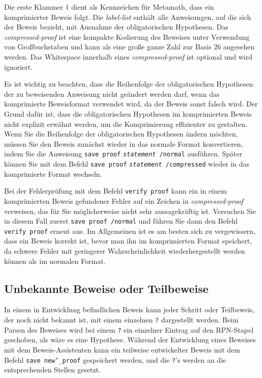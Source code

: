 Die  erste Klammer \texttt{(} dient als Kennzeichen für Metamath, dass ein komprimierter Beweis folgt.  Die {\em label-list} enthält alle Anweisungen, auf die sich der Beweis bezieht, mit Ausnahme der obligatorischen Hypothesen.  Das {\em compressed-proof} ist eine kompakte Kodierung des Beweises unter Verwendung von Großbuchstaben und kann als eine große ganze Zahl zur Basis 26 angesehen werden.  Das Whitespace innerhalb eines {\em compressed-proof} ist optional und wird ignoriert.

Es ist wichtig zu beachten, dass die Reihenfolge der obligatorischen Hypothesen der zu beweisenden Anweisung nicht geändert werden darf, wenn das komprimierte Beweisformat verwendet wird, da der Beweis sonst falsch wird.  Der Grund dafür ist, dass die obligatorischen Hypothesen im komprimierten Beweis nicht explizit erwähnt werden, um die Komprimierung effizienter zu gestalten. Wenn Sie die Reihenfolge der obligatorischen Hypothesen ändern möchten, müssen Sie den Beweis zunächst wieder in das normale Format konvertieren, indem Sie die Anweisung \texttt{save proof} \texttt{{\em statement} /normal} ausführen. Später können Sie mit dem Befehl \texttt{save proof} \texttt{{\em statement} /compressed} wieder in das komprimierte Format wechseln. 

Bei der Fehlerprüfung mit dem Befehl \texttt{verify proof} kann ein in einem komprimierten Beweis gefundener Fehler auf ein Zeichen in {\em compressed-proof} verweisen, das für Sie möglicherweise nicht sehr aussagekräftig ist.  Versuchen Sie in diesem Fall zuerst \texttt{save proof /normal} und führen Sie dann den Befehl \texttt{verify proof} erneut aus.  Im Allgemeinen ist es am besten sich zu vergewissern, dass ein Beweis korrekt ist, bevor man ihn im komprimierten Format speichert, da schwere Fehler mit geringerer Wahrscheinlichkeit wiederhergestellt werden können als im normalen Format. 

\subsection{Unbekannte Beweise oder Teilbeweise}\label{unknown}

In einem in Entwicklung befindlichen Beweis kann jeder Schritt oder Teilbeweis, der noch nicht bekannt ist, mit einem einzelnen \texttt{?} dargestellt werden.  Beim Parsen des Beweises wird bei einem \texttt{?}\index{\texttt{]}@\texttt{?}\ innerhalb von Beweisen} ein einzelner Eintrag auf den RPN-Stapel geschoben, als wäre es eine Hypothese.  Während der Entwicklung eines Beweises mit dem Beweis-Assistenten kann ein teilweise entwickelter Beweis mit dem Befehl \texttt{save new{\char`\_}proof} gespeichert werden, und die \texttt{?}'s werden an die entsprechenden Stellen gesetzt. 

